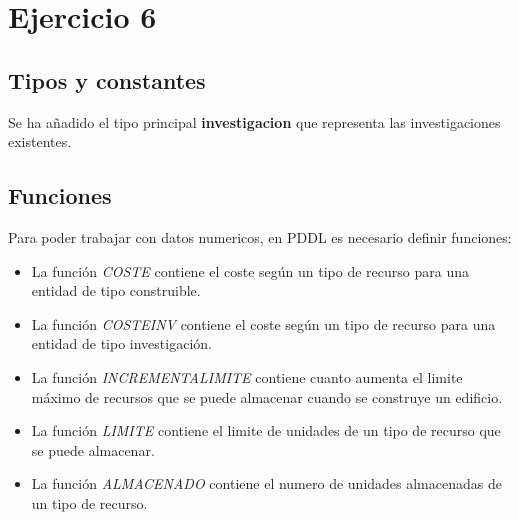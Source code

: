 \section{Ejercicio 6}
\subsection{Tipos y constantes}
Se ha añadido el tipo principal \textbf{investigacion} que representa las investigaciones existentes.
\subsection{Funciones}
Para poder trabajar con datos numericos, en PDDL es necesario definir funciones:
\begin{itemize}
   \item La función \textit{COSTE} contiene el coste según un tipo de recurso para una entidad de tipo construible.
   \item La función \textit{COSTEINV} contiene el coste según un tipo de recurso para una entidad de tipo investigación.
   \item La función \textit{INCREMENTALIMITE} contiene cuanto aumenta el limite máximo de recursos que se puede almacenar cuando se construye un edificio.
   \item La función \textit{LIMITE} contiene el limite de unidades de un tipo de recurso que se puede almacenar.
   \item La función \textit{ALMACENADO} contiene el numero de unidades almacenadas de un tipo de recurso.
\end{itemize}
